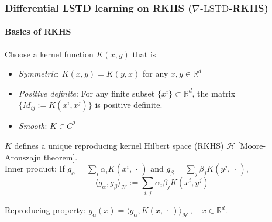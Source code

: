\documentclass[xcolor=dvipsnames, subsection=false]{beamer}
\def\alertb#1{\alert{\color{BrickRed}  #1}}
\def\alertb#1{\alert{\color{BrickRed}  #1}}
\def\clH{{\mathcal H}}
\newcommand{\field}[1]{\mathbb{#1}}
\def\Re{\field{R}}
\def\varble{\,\cdot\,}
\def\eqdef{\mathbin{:=}}
\def\state{{\sf X}}
\def\Kern{K}
\def\gradTD{\nabla\text{-LSTD}}
\def\bl#1{{\color{blue}#1}}
\begin{document}
\begin{frame}
\frametitle{Differential LSTD learning on RKHS ($\gradTD$-RKHS)}
\framesubtitle{Basics of RKHS}
%
%	


\begin{minipage}[t][6.5cm][t]{\textwidth}
Choose a kernel function $\Kern(x,y)$ that is 
\begin{itemize}
\item \textit{Symmetric}:  $\Kern(x,y)=\Kern(y,x)$ for any $x,y\in\Re^d$ \\
\item \textit{Positive definite}:  For any finite subset $\{x^i\}\subset \Re^d$, the matrix   $\{ M_{ij}\eqdef  \Kern(x^i, x^j)\}$ is positive definite. \\
\item \textit{Smooth}: $\Kern \in C^2$ 
\end{itemize}
$\Kern$ defines a unique reproducing kernel Hilbert space (RKHS) $\clH$ {\footnotesize\bl{[Moore-Aronszajn theorem]}}.  \\
\alertb{Inner product: } If $g_\alpha = \sum_i \alpha_i \Kern(x^i,\varble)$ and $g_\beta = \sum_j \beta_j \Kern(y^j,\varble)$,
\[
\langle g_\alpha , g_\beta\rangle_\clH \eqdef \sum_{i,j}\alpha_i \beta_j \Kern(x^i, y^j)
\]

\smallskip

\alertb{Reproducing property:}
$g_\alpha(x)  = \langle g_\alpha , \Kern(x,\varble) \rangle_\clH \,, \quad x\in \Re^d $.

\end{minipage}
\end{frame}
\end{document}
